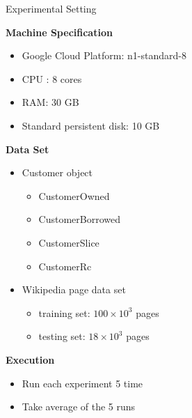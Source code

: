 \documentclass[9pt]{beamer}
\begin{document}

% 


\begin{frame}[t, fragile]{Experimental Setting}
    
    \textbf{Machine Specification}
    \begin{itemize}
        \item Google Cloud Platform: n1-standard-8
        \item CPU : 8 cores
        \item RAM: 30 GB
        \item Standard persistent disk: 10 GB
    \end{itemize}
    \textbf{Data Set}
    \begin{itemize}
        \item Customer object
        \begin{itemize}
            \item CustomerOwned
            \item CustomerBorrowed
            \item CustomerSlice
            \item CustomerRc
        \end{itemize} 
        \item Wikipedia page data set
        \begin{itemize}
            \item training set: \(100 \times 10^3 \) pages
            \item testing set: \(18 \times  10^3\) pages
        \end{itemize} 
    \end{itemize} 
    \textbf{Execution}
    \begin{itemize}
        \item Run each experiment 5 time 
        \item Take average of the 5 runs 
    \end{itemize}
\end{frame}
\end{document}
